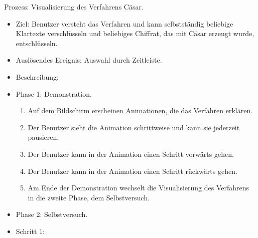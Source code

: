 \documentclass{article}
\begin{document}
\begin{FA}[start=110]
 \item Prozess: Visualisierung des Verfahrens Cäsar.
\end{FA}
\begin{itemize}[label={}]

 \item Ziel: Benutzer versteht das Verfahren und kann selbstständig 
beliebige Klartexte verschlüsseln und beliebiges Chiffrat, das mit 
Cäsar erzeugt wurde, entschlüsseln.

 \item Auslösendes Ereignis: Auswahl durch Zeitleiste.

 \item Beschreibung:

 \item Phase 1: Demonstration.

	\begin{enumerate}
	 \item Auf dem Bildschirm erscheinen Animationen, die das Verfahren erklären.
	 \item Der Benutzer sieht die Animation schrittweise und kann sie jederzeit pausieren.
	 \item Der Benutzer kann in der Animation einen Schritt vorwärts gehen.
	 \item Der Benutzer kann in der Animation einen Schritt rückwärts gehen. 
	 \item Am Ende der Demonstration wechselt die Visualisierung des Verfahrens in die zweite Phase, dem Selbstversuch.
	\end{enumerate}

 \item Phase 2: Selbstversuch.

 \item Schritt 1:


\end{itemize}
\end{document}
